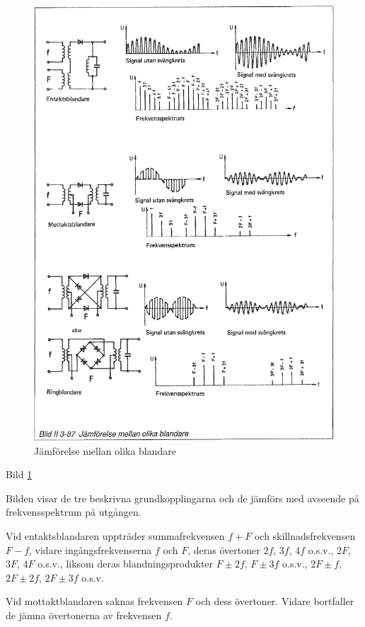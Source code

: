 \begin{figure}
\includegraphics[width=\textwidth]{images/bild_2_3-87}
\caption{Jämförelse mellan olika blandare}
\label{fig:BildII3-87}
\end{figure}

Bild \ref{fig:BildII3-87}

Bilden visar de tre beskrivna grundkopplingarna och de jämförs med
avseende på frekvensspektrum på utgången.

Vid entaktsblandaren uppträder summafrekvensen \(f + F\) och
skillnadsfrekvensen \(F - f\), vidare ingångsfrekvenserna \(f\) och
\(F\), deras övertoner \(2f\), \(3f\), \(4f\) o.s.v., \(2F\), \(3F\),
\(4F\) o.s.v., liksom deras blandningsprodukter \(F\pm 2f\), \(F\pm
3f\) o.s.v., \(2F \pm f\), \(2F \pm 2f\), \(2F \pm 3f\) o.s.v.

Vid mottaktblandaren saknas frekvensen \(F\) och dess övertoner. Vidare
bortfaller de jämna övertonerna av frekvensen \(f\).


